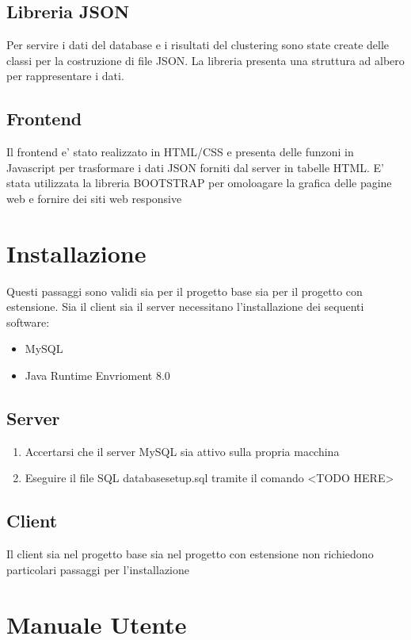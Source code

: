 \documentclass{article}
\begin{document}
        \subsection{Libreria JSON}
        Per servire i dati del database e i risultati del clustering sono state
        create delle classi per la costruzione di file JSON. La libreria
        presenta una struttura ad albero per rappresentare i dati.

        \subsection{Frontend}
        Il frontend e' stato realizzato in HTML/CSS e presenta delle funzoni 
        in Javascript per trasformare i dati JSON forniti dal server in tabelle
        HTML. E' stata utilizzata la libreria BOOTSTRAP per omoloagare la 
        grafica delle pagine web e fornire dei siti web responsive

    \newpage
    \section{Installazione}
    Questi passaggi sono validi sia per il progetto base sia per il progetto con
    estensione.
    Sia il client sia il server necessitano l'installazione dei sequenti
    software:
        \begin{itemize}
            \item MySQL
            \item Java Runtime Envrioment 8.0
        \end{itemize}

        \subsection{Server}
            \begin{enumerate}
                \item Accertarsi che il server MySQL sia attivo sulla propria
                macchina
                \item Eseguire il file SQL databasesetup.sql tramite il comando 
                <TODO HERE>
            \end{enumerate}

        \subsection{Client}
        Il client sia nel progetto base sia nel progetto con estensione non
        richiedono particolari passaggi per l'installazione
    
    \section{Manuale Utente}




    
\end{document}
